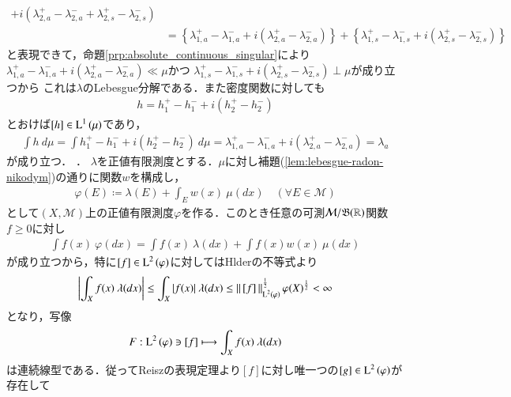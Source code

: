 \begin{prf}
\begin{description}
{\begin{align}
					+ i\left( \lambda_{2,a}^+ - \lambda_{2,a}^- + \lambda_{2,s}^+ - \lambda_{2,s}^- \right) \\
				&= \left\{ \lambda_{1,a}^+ - \lambda_{1,a}^- + i\left( \lambda_{2,a}^+ - \lambda_{2,a}^- \right) \right\}
					+ \left\{ \lambda_{1,s}^+ - \lambda_{1,s}^- + i\left( \lambda_{2,s}^+ - \lambda_{2,s}^- \right) \right\}
			\end{align}
			と表現できて，命題\ref{prp:absolute_continuous_singular}により
			$\lambda_{1,a}^+ - \lambda_{1,a}^- + i\left( \lambda_{2,a}^+ - \lambda_{2,a}^- \right) \ll \mu$かつ
			$\lambda_{1,s}^+ - \lambda_{1,s}^- + i\left( \lambda_{2,s}^+ - \lambda_{2,s}^- \right) \perp \mu$が成り立つから
			これは$\lambda$のLebesgue分解である．また密度関数に対しても
			\begin{align}
				h = h_1^+ - h_1^- + i \left( h_2^+ - h_2^- \right)
			\end{align}
			とおけば$[h] \in \operatorname{L}^{1} \left(\mu\right)$であり，
			\begin{align}
				\int h\ d\mu = \int h_1^+ - h_1^- + i \left( h_2^+ - h_2^- \right)\ d\mu = \lambda_{1,a}^+ - \lambda_{1,a}^- + i \left( \lambda_{2,a}^+ - \lambda_{2,a}^- \right) = \lambda_a
			\end{align}
			が成り立つ．
		}．
		$\lambda$を正値有限測度とする．$\mu$に対し補題(\ref{lem:lebesgue-radon-nikodym})の通りに関数$w$を構成し，
		\begin{align}
			\varphi(E) \coloneqq \lambda(E) + \int_E w(x)\ \mu(dx) \quad (\forall E \in \mathcal{M})
		\end{align}
		として$(X,\mathcal{M})$上の正値有限測度$\varphi$を作る．このとき任意の可測$\mathcal{M}/\mathfrak{B}(\mathbb{R})$関数$f \geq 0$に対し
		\begin{align}
			\int f(x)\ \varphi(dx) = \int f(x)\ \lambda(dx) + \int f(x)w(x)\ \mu(dx)
			\label{eq:lebesgue_radon_nikodym}
		\end{align}
		が成り立つから，特に$[f] \in \operatorname{L}^{2} \left(\varphi\right)$に対してはHlderの不等式より
		\begin{align}
			\left| \int_X f(x)\ \lambda(dx) \right| \leq \int_X |f(x)|\ \lambda(dx) \leq \Norm{[f]}{\Lp{2}{\varphi}}^{\frac{1}{2}} \varphi(X)^{\frac{1}{2}} < \infty
		\end{align}
		となり，写像
		\begin{align}
			F:\Lp{2}{\varphi} \ni [f] \longmapsto \int_X f(x)\ \lambda(dx)
		\end{align}
		は連続線型である．従ってReiszの表現定理より$[f]$に対し唯一つの$[g] \in \operatorname{L}^{2} \left(\varphi\right)$が存在して
		\begin{align}

\end{align}
\end{description}
\end{prf}
